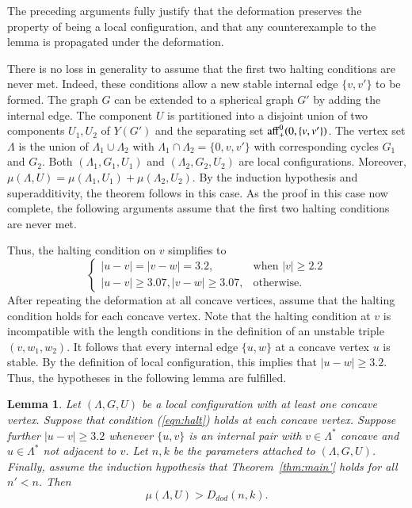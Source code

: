 \documentclass{article} %
\newtheorem{lemma}{Lemma}[subsection]
\begin{document}
The preceding arguments fully justify that the deformation preserves
the property of being a local configuration, and that
any counterexample to the lemma is propagated under
the deformation.


There is no loss in generality to assume that the first two halting conditions are never
met.  Indeed, these conditions allow a new stable internal edge $\{v,v'\}$ to be formed.  The
graph $G$ can be extended to a spherical graph $G'$ by adding the internal edge.
The component $U$ is partitioned into a disjoint union of two components $U_1,U_2$ 
of $Y(G')$ and the separating set ${\operatorname{aff}}_+^0(0,\{v,v'\})$.  The vertex set
$\Lambda$ is the union of $\Lambda_1\cup\Lambda_2$ with $\Lambda_1\cap\Lambda_2=\{0,v,v'\}$
with corresponding cycles $G_1$ and $G_2$.  Both $(\Lambda_1,G_1,U_1)$ and $(\Lambda_2,G_2,U_2)$ are local configurations.  Moreover, $\mu(\Lambda,U) = \mu(\Lambda_1,U_1)+\mu(\Lambda_2,U_2)$.  By the induction hypothesis and superadditivity, the theorem follows in this case.
As the proof in this case now complete, the following arguments
assume that the first two halting conditions are never met.

Thus, the halting condition on $v$ simplifies to 
\begin{equation}\label{eqn:halt}
\begin{cases}
|u-v|=|v-w|=3.2,& \text{when } |v|\ge 2.2\\
|u-v|\ge 3.07, |v-w|\ge 3.07,& \text{otherwise.}
\end{cases}
\end{equation}
After repeating the deformation at all concave vertices, assume that the halting condition
holds for each concave vertex.  Note that the halting
condition at $v$ is incompatible with the length conditions in
the definition of an unstable triple $(v,w_1,w_2)$.  It
follows that every internal edge $\{u,w\}$
at a concave vertex $u$ is stable.  By the definition of local configuration, this
implies that $|u-w|\ge 3.2$.  Thus, the hypotheses in the following lemma are fulfilled.

\begin{lemma}\label{lemma:concave}  
Let $(\Lambda,G,U)$ be a local configuration with at least one
concave vertex.  Suppose that 
condition (\ref{eqn:halt}) holds at each concave vertex.  Suppose further  $|u-v|\ge 3.2$ whenever $\{u,v\}$ is an internal
pair with $v\in\Lambda^*$ concave and $u\in\Lambda^*$ not adjacent to $v$.
Let $n,k$ be the parameters attached
to $(\Lambda,G,U)$.  Finally, assume the induction hypothesis that Theorem~\ref{thm:main'}
holds for all $n'<n$. Then
   $$\mu(\Lambda,U) > D_{dod}(n,k).$$
\end{lemma}
\end{document}
